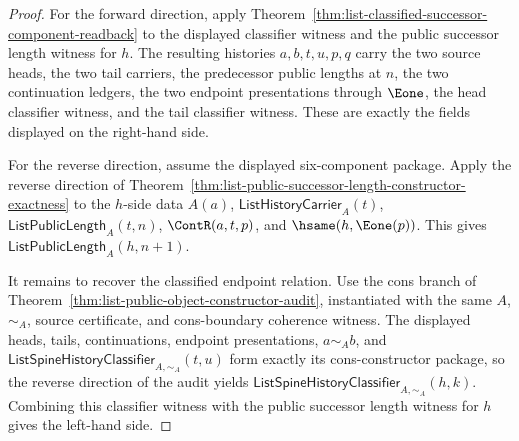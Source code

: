 \begin{proof}
For the forward direction, apply
Theorem~\ref{thm:list-classified-successor-component-readback} to the
displayed classifier witness and the public successor length witness for $h$.
The resulting histories $a,b,t,u,p,q$ carry the two source heads, the two tail
carriers, the predecessor public lengths at $n$, the two continuation ledgers,
the two endpoint presentations through $\Eone$, the head classifier witness,
and the tail classifier witness. These are exactly the fields displayed on the
right-hand side.

For the reverse direction, assume the displayed six-component package. Apply
the reverse direction of
Theorem~\ref{thm:list-public-successor-length-constructor-exactness} to the
$h$-side data $A(a)$, $\mathsf{ListHistoryCarrier}_A(t)$,
$\mathsf{ListPublicLength}_A(t,n)$, $\ContR(a,t,p)$, and
$\hsame(h,\Eone(p))$. This gives
$\mathsf{ListPublicLength}_A(h,n+1)$.

It remains to recover the classified endpoint relation. Use the cons branch of
Theorem~\ref{thm:list-public-object-constructor-audit}, instantiated with the
same $A$, $\sim_A$, source certificate, and cons-boundary coherence witness.
The displayed heads, tails, continuations, endpoint presentations,
$a\sim_A b$, and
$\mathsf{ListSpineHistoryClassifier}_{A,\sim_A}(t,u)$ form exactly its
cons-constructor package, so the reverse direction of the audit yields
$\mathsf{ListSpineHistoryClassifier}_{A,\sim_A}(h,k)$. Combining this
classifier witness with the public successor length witness for $h$ gives the
left-hand side.
\end{proof}

